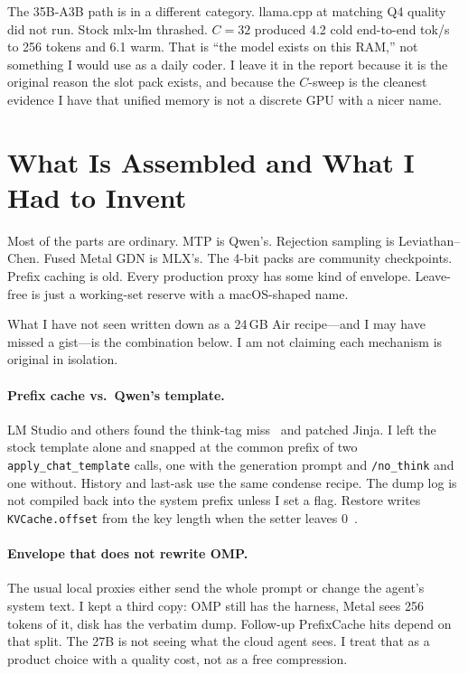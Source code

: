 The 35B-A3B path is in a different category. llama.cpp at matching Q4 quality did not run. Stock mlx-lm thrashed. $C{=}32$ produced 4.2 cold end-to-end tok/s to 256 tokens and 6.1 warm. That is ``the model exists on this RAM,'' not something I would use as a daily coder. I leave it in the report because it is the original reason the slot pack exists, and because the $C$-sweep is the cleanest evidence I have that unified memory is not a discrete GPU with a nicer name.

\section{What Is Assembled and What I Had to Invent}
\label{sec:unique}

Most of the parts are ordinary. MTP is Qwen's. Rejection sampling is Leviathan--Chen. Fused Metal GDN is MLX's. The 4-bit packs are community checkpoints. Prefix caching is old. Every production proxy has some kind of envelope. Leave-free is just a working-set reserve with a macOS-shaped name.

What I have not seen written down as a 24\,GB Air recipe---and I may have missed a gist---is the combination below. I am not claiming each mechanism is original in isolation.

\paragraph{Prefix cache vs.\ Qwen's template.}
LM Studio and others found the think-tag miss~\citep{qwen31826,mlxengine176} and patched Jinja. I left the stock template alone and snapped at the common prefix of two \texttt{apply\_chat\_template} calls, one with the generation prompt and \texttt{/no\_think} and one without. History and last-ask use the same condense recipe. The dump log is not compiled back into the system prefix unless I set a flag. Restore writes \texttt{KVCache.offset} from the key length when the setter leaves 0~\citep{mlxlm1162}.

\paragraph{Envelope that does not rewrite OMP.}
The usual local proxies either send the whole prompt or change the agent's system text. I kept a third copy: OMP still has the harness, Metal sees 256 tokens of it, disk has the verbatim dump. Follow-up PrefixCache hits depend on that split. The 27B is not seeing what the cloud agent sees. I treat that as a product choice with a quality cost, not as a free compression.

